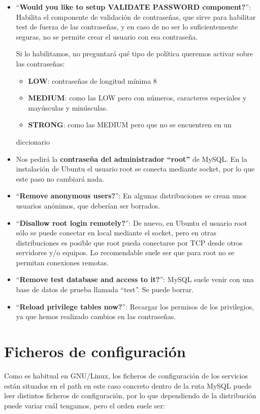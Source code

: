\begin{itemize}
    \item “\textbf{Would you like to setup VALIDATE PASSWORD component?}”: Habilita el componente de validación de contraseñas, que sirve para habilitar test de fuerza de las contraseñas, y en caso de no ser lo suficientemente seguras, no se permite crear el usuario con esa contraseña.


    Si lo habilitamos, no preguntará qué tipo de política queremos activar sobre las contraseñas:
        \begin{itemize}
            \item \textbf{LOW}: contraseñas de longitud mínima 8
            \item \textbf{MEDIUM}: como las LOW pero con números, caracteres especiales y mayúsculas y minúsculas.
            \item \textbf{STRONG}: como las MEDIUM pero que no se encuentren en un
        \end{itemize} diccionario
    \item Nos pedirá la \textbf{contraseña del administrador “root”} de MySQL.  En la instalación de Ubuntu el usuario root se conecta mediante socket, por lo que este paso no cambiará nada.
    \item “\textbf{Remove anonymous users?}”: En algunas distribuciones  se crean unos usuarios anónimos, que deberían ser borrados.
    \item “\textbf{Disallow root login remotely?}”: De nuevo, en Ubuntu el usuario root sólo se puede conectar en local mediante el socket, pero en otras distribuciones es posible que root pueda conectarse por TCP desde otros servidores y/o equipos. Lo recomendable suele ser que para root no se permitan conexiones remotas.

    \item “\textbf{Remove test database and access to it?}”: MySQL suele venir con una base de datos de prueba llamada “test”. Se puede borrar.

    \item “\textbf{Reload privilege tables now?}”: Recargar los permisos de los privilegios, ya que hemos realizado cambios en las contraseñas.
\end{itemize}


\section{Ficheros de configuración}
Como es habitual en GNU/Linux, los ficheros de configuración de los servicios están situados en el path \configdir{\etc} en este caso concreto dentro de la ruta  MySQL puede leer distintos ficheros de configuración, por lo que dependiendo de la distribución puede variar cuál tengamos, pero el orden suele ser:

